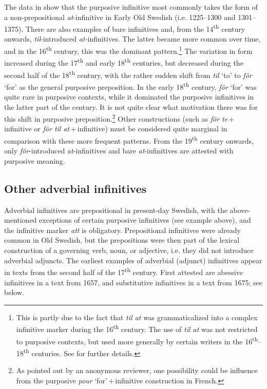\documentclass[output=paper]{langscibook}
\begin{document}
The data in  show that the purposive infinitive most commonly takes the form of a non-prepositional \textit{at}{}-infinitive in Early Old Swedish (i.e. 1225–1300 and 1301–1375). There are also examples of bare infinitives and, from the 14\textsuperscript{th} century onwards, \textit{til}{}-introduced \textit{at-}infinitives. The latter became more common over time, and in the 16\textsuperscript{th} century, this was the dominant pattern.\footnote{This is partly due to the fact that \textit{til at} was grammaticalized into a complex infinitive marker during the 16\textsuperscript{th} century. The use of \textit{til at} was not restricted to purposive contexts, but used more generally by certain writers in the 16\textsuperscript{th}–18\textsuperscript{th} centuries. See \textcites[]{Kalm2016Prepositioner}[203–221]{Kalm2016Satsekvivalenta} for further details.} The variation in form increased during the 17\textsuperscript{th} and early 18\textsuperscript{th} centuries, but decreased during the second half of the 18\textsuperscript{th} century, with the rather sudden shift from \textit{til} ‘to’ to \textit{för} ‘for’ as the general purposive preposition. In the early 18\textsuperscript{th} century, \textit{för} ‘for’ was quite rare in purposive contexts, while it dominated the purposive infinitives in the latter part of the century. It is not quite clear what motivation there was for this shift in purposive preposition.\footnote{As pointed out by an anonymous reviewer, one possibility could be influence from the purposive \textit{pour} ‘for’\,+\,infinitive construction in French.}  Other constructions (such as \textit{för te}\,+\,infinitive or \textit{för til at}\,+\,infinitive) must be considered quite marginal in comparison with these more frequent patterns. From the 19\textsuperscript{th} century onwards, only \textit{för}{}-introduced \textit{at}{}-infinitives and bare \textit{at}{}-infinitives are attested with purposive meaning. 


\subsection{Other adverbial infinitives}\label{sec:kalm:4.2}

Adverbial infinitives are prepositional in present-day Swedish, with the above-mentioned exceptions of certain purposive infinitives (see example  above), and the infinitive marker \textit{att} is obligatory. Prepositional infinitives were already common in Old Swedish, but the prepositions were then part of the lexical construction of a governing verb, noun, or adjective, i.e. they did not introduce adverbial adjuncts. The earliest examples of adverbial (adjunct) infinitives appear in texts from the second half of the 17\textsuperscript{th} century. First attested are abessive infinitives in a text from 1657, and substitutive infinitives in a text from 1675; see  below. 
\end{document}
